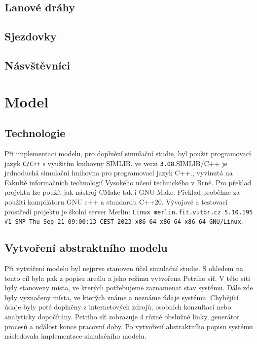 \documentclass[a4paper, 11pt]{article}\usepackage{times}
\begin{document}
\subsection{Lanové dráhy}
\subsection{Sjezdovky}
\subsection{Násvštěvníci}
\section{Model}  %
\subsection{Technologie}
Při implementaci modelu, pro doplnění simulační studie, byl použit programovací jazyk \texttt{C/C++} s využitím knihovny SIMLIB. \cite{SIMLIB} ve verzi \texttt{3.08}.SIMLIB/C++ je jednoduchá simulační hnihovna pro programovací jazyk C++., vyvinutá na Fakultě informačních technologií Vysokého učení technického v Brně. Pro překlad projektu lze použít jak nástroj CMake tak i GNU Make. Překlad proběhne za  použití kompilátoru GNU c++ a standardu C++20. Vývojové a testovací prostředí projektu je školní server Merlin: \texttt{Linux merlin.fit.vutbr.cz 5.10.195 \#1 SMP Thu Sep 21  09:00:13 CEST 2023 x86\_64 x86\_64 x86\_64 GNU/Linux}.

\subsection{Vytvoření abstraktního modelu}
Při vytváření modelu byl nejprve stanoven účel simulační studie. S ohledem na tento cíl byla pak z popisu areálu a jeho režimu vytvořena Petriho síť. V této síti byly stanoveny místa, ve kterých potřebujeme zaznamenat stav systému. Dále zde byly vyznačeny místa, ve kterých známe a neznáme údaje systému. Chybějící údaje byly poté doplněny z internetových zdrojů, osobních konzultací nebo analyticky dopočítány. Petriho síť zobrazuje 4 různé obslužné linky, generátor procesů a událost konce pracovní doby. Po vytvoření abstraktního popisu systému následovala implementace simulačního modelu.
\end{document}
